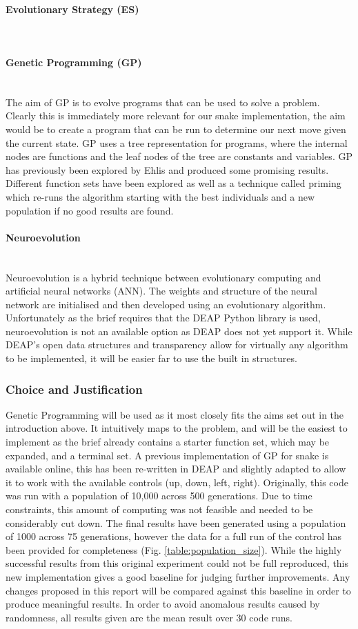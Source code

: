 \documentclass{article}
\newcommand{\myparagraph}[1]{\paragraph{#1}\mbox{}\\}
\begin{document}
\myparagraph{Evolutionary Strategy (ES)}

\myparagraph{Genetic Programming (GP)}
The aim of GP is to evolve programs that can be used to solve a problem. Clearly this is immediately more relevant for our snake implementation, the aim would be to create a program that can be run to determine our next move given the current state. GP uses a tree representation for programs, where the internal nodes are functions and the leaf nodes of the tree are constants and variables. GP has previously been explored by Ehlis\cite{snake_blog} and produced some promising results. Different function sets have been explored as well as a technique called priming which re-runs the algorithm starting with the best individuals and a new population if no good results are found.

\myparagraph{Neuroevolution}
Neuroevolution is a hybrid technique between evolutionary computing and artificial neural networks (ANN). The weights and structure of the neural network are initialised and then developed using an evolutionary algorithm. Unfortunately as the brief requires that the DEAP Python library is used, neuroevolution is not an available option as DEAP does not yet support it. While DEAP's open data structures and transparency allow for virtually any algorithm to be implemented, it will be easier far to use the built in structures.

\subsubsection{Choice and Justification}
Genetic Programming will be used as it most closely fits the aims set out in the introduction above. It intuitively maps to the problem, and will be the easiest to implement as the brief already contains a starter function set, which may be expanded, and a terminal set. A previous implementation of GP for snake is available online\cite{snake_blog}, this has been re-written in DEAP and slightly adapted to allow it to work with the available controls (up, down, left, right). Originally, this code was run with a population of 10,000 across 500 generations. Due to time constraints, this amount of computing was not feasible and needed to be considerably cut down. The final results have been generated using a population of 1000 across 75 generations, however the data for a full run of the control has been provided for completeness (Fig. \ref{table:population_size}). While the highly successful results from this original experiment could not be full reproduced, this new implementation gives a good baseline for judging further improvements. Any changes proposed in this report will be compared against this baseline in order to produce meaningful results. In order to avoid anomalous results caused by randomness, all results given are the mean result over 30 code runs.%
\end{document}
